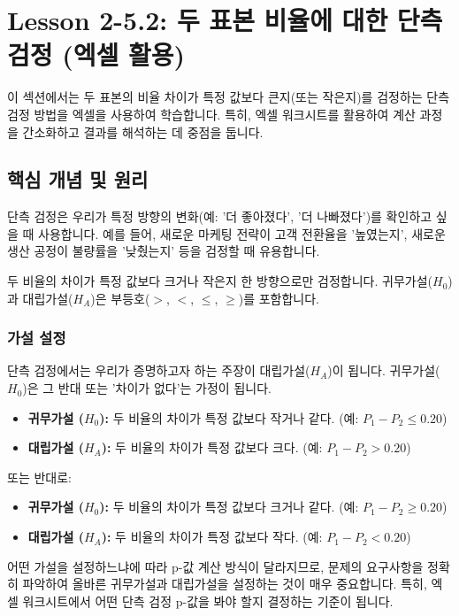 \documentclass[11pt,a4paper]{article}
\theoremstyle{definition}
\begin{document}
\newpage
\section{Lesson 2-5.2: 두 표본 비율에 대한 단측 검정 (엑셀 활용)}

이 섹션에서는 두 표본의 비율 차이가 특정 값보다 큰지(또는 작은지)를 검정하는 단측 검정 방법을 엑셀을 사용하여 학습합니다. 특히, 엑셀 워크시트를 활용하여 계산 과정을 간소화하고 결과를 해석하는 데 중점을 둡니다.

\subsection{핵심 개념 및 원리}

단측 검정은 우리가 특정 방향의 변화(예: '더 좋아졌다', '더 나빠졌다')를 확인하고 싶을 때 사용합니다. 예를 들어, 새로운 마케팅 전략이 고객 전환율을 '높였는지', 새로운 생산 공정이 불량률을 '낮췄는지' 등을 검정할 때 유용합니다.

\begin{summarybox}[title=단측 검정의 핵심:]
두 비율의 차이가 특정 값보다 크거나 작은지 한 방향으로만 검정합니다.
귀무가설($H_0$)과 대립가설($H_A$)은 부등호($>$, $<$, $\le$, $\ge$)를 포함합니다.
\end{summarybox}

\subsubsection{가설 설정}
단측 검정에서는 우리가 증명하고자 하는 주장이 대립가설($H_A$)이 됩니다. 귀무가설($H_0$)은 그 반대 또는 '차이가 없다'는 가정이 됩니다.

\begin{itemize}
    \item \textbf{귀무가설 ($H_0$):} 두 비율의 차이가 특정 값보다 작거나 같다. (예: $P_1 - P_2 \le 0.20$)
    \item \textbf{대립가설 ($H_A$):} 두 비율의 차이가 특정 값보다 크다. (예: $P_1 - P_2 > 0.20$)
\end{itemize}
또는 반대로:
\begin{itemize}
    \item \textbf{귀무가설 ($H_0$):} 두 비율의 차이가 특정 값보다 크거나 같다. (예: $P_1 - P_2 \ge 0.20$)
    \item \textbf{대립가설 ($H_A$):} 두 비율의 차이가 특정 값보다 작다. (예: $P_1 - P_2 < 0.20$)
\end{itemize}

\begin{cautionbox}[title=가설 설정 시 주의사항:]
어떤 가설을 설정하느냐에 따라 p-값 계산 방식이 달라지므로, 문제의 요구사항을 정확히 파악하여 올바른 귀무가설과 대립가설을 설정하는 것이 매우 중요합니다. 특히, 엑셀 워크시트에서 어떤 단측 검정 p-값을 봐야 할지 결정하는 기준이 됩니다.
\end{cautionbox}
\end{document}
